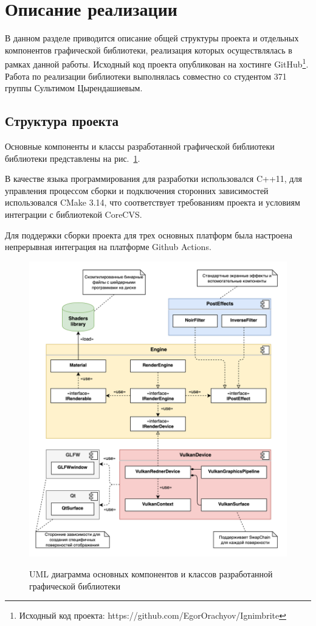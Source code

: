 \documentclass[14pt]{matmex-diploma}
\begin{document}

\section{Описание реализации}

В данном разделе приводится описание общей структуры проекта и отдельных компонентов  графической библиотеки, реализация которых осуществлялась в рамках данной работы. Исходный код проекта опубликован на хостинге GitHub\footnote{Исходный код проекта: https://github.com/EgorOrachyov/Ignimbrite}. Работа по реализации библиотеки выполнялась совместно со студентом 371 группы Сультимом Цырендашиевым.

\subsection{Структура проекта}

Основные компоненты и классы разработанной графической библиотеки библиотеки представлены на рис.~\ref{fig:library:uml}. 

В качестве языка программирования для разработки использовался C++11, для управления процессом сборки и подключения сторонних зависимостей использовался CMake 3.14, что соответствует требованиям проекта и условиям интеграции с библиотекой CoreCVS.

Для поддержки сборки проекта для трех основных платформ была настроена непрерывная интеграция на платформе Github Actions.

\begin{figure}[]
     \caption{UML диаграмма основных компонентов и классов разработанной графической библиотеки}
     \centering
     \includegraphics[width=1.0\textwidth]{pictures/IgnimbriteStructure}
     \label{fig:library:uml}
\end{figure}
\end{document}
